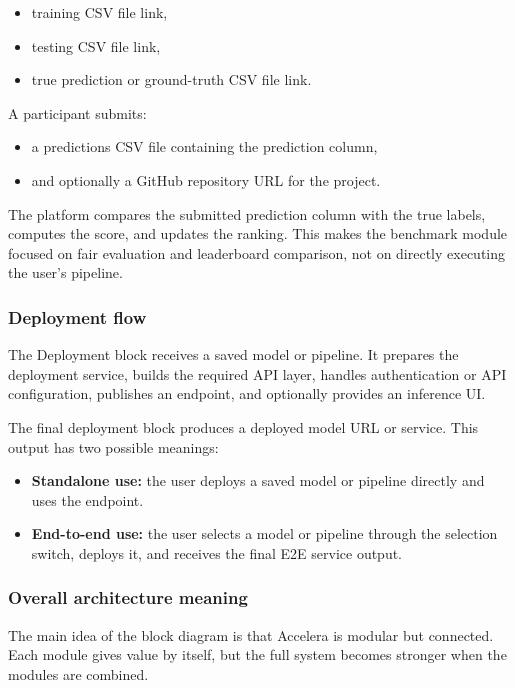 \documentclass[12pt,a4paper]{report}
\begin{document}
\begin{itemize}
  \item training CSV file link,
  \item testing CSV file link,
  \item true prediction or ground-truth CSV file link.
\end{itemize}

A participant submits:

\begin{itemize}
  \item a predictions CSV file containing the prediction column,
  \item and optionally a GitHub repository URL for the project.
\end{itemize}

The platform compares the submitted prediction column with the true labels,
computes the score, and updates the ranking. This makes the benchmark module
focused on fair evaluation and leaderboard comparison, not on directly executing
the user's pipeline.

\subsubsection*{Deployment flow}

The Deployment block receives a saved model or pipeline. It prepares the
deployment service, builds the required API layer, handles authentication or API
configuration, publishes an endpoint, and optionally provides an inference UI.

The final deployment block produces a deployed model URL or service. This output
has two possible meanings:

\begin{itemize}
  \item \textbf{Standalone use:} the user deploys a saved model or pipeline
  directly and uses the endpoint.
  \item \textbf{End-to-end use:} the user selects a model or pipeline through the
  selection switch, deploys it, and receives the final E2E service output.
\end{itemize}

\subsubsection*{Overall architecture meaning}

The main idea of the block diagram is that Accelera is modular but connected.
Each module gives value by itself, but the full system becomes stronger when the
modules are combined.
\end{document}
